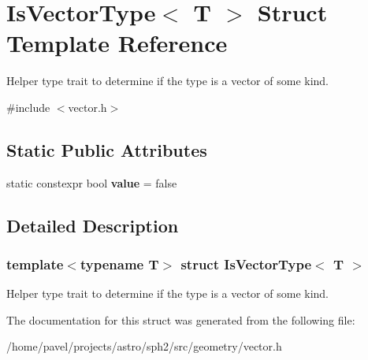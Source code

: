 \hypertarget{structIsVectorType}{}\section{Is\+Vector\+Type$<$ T $>$ Struct Template Reference}
\label{structIsVectorType}


Helper type trait to determine if the type is a vector of some kind.  




{\ttfamily \#include $<$vector.\+h$>$}

\subsection*{Static Public Attributes}
\begin{DoxyCompactItemize}
\item 
\hypertarget{structIsVectorType_afdf963da742e2c4b725e0e1f6390feda}{}\label{structIsVectorType_afdf963da742e2c4b725e0e1f6390feda} 
static constexpr bool {\bfseries value} = false
\end{DoxyCompactItemize}


\subsection{Detailed Description}
\subsubsection*{template$<$typename T$>$\newline
struct Is\+Vector\+Type$<$ T $>$}

Helper type trait to determine if the type is a vector of some kind. 

The documentation for this struct was generated from the following file\+:\begin{DoxyCompactItemize}
\item 
/home/pavel/projects/astro/sph2/src/geometry/vector.\+h\end{DoxyCompactItemize}
